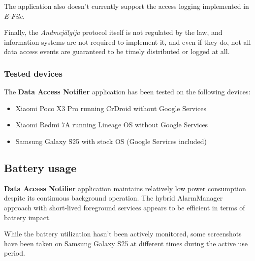 The application also doesn't currently support the access logging implemented in \textit{E-File}.

Finally, the \textit{Andmejälgija} protocol itself is not regulated by the law, and information systems are not required to implement it, and even if they do, not all data access events are guaranteed to be timely distributed or logged at all.

\subsubsection{Tested devices}
The \textbf{Data Access Notifier} application has been tested on the following devices:
\begin{itemize}
    \item Xiaomi Poco X3 Pro running CrDroid without Google Services 
    \item Xiaomi Redmi 7A running Lineage OS without Google Services
    \item Samsung Galaxy S25 with stock OS (Google Services included)
\end{itemize}

\subsection{Battery usage}
\textbf{Data Access Notifier} application maintains relatively low power consumption despite its continuous background operation. The hybrid AlarmManager approach with short-lived foreground services appears to be efficient in terms of battery impact.

While the battery utilization hasn't been actively monitored, some screenshots have been taken on Samsung Galaxy S25 at different times during the active use period.

